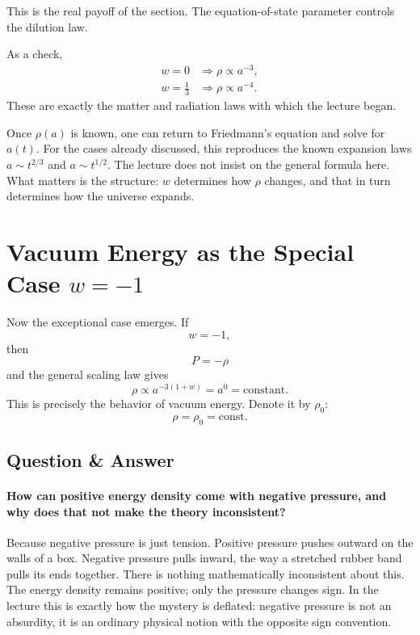 This is the real payoff of the section. The equation-of-state parameter controls the dilution law.

As a check,
\begin{align}
w=0
&\Longrightarrow
\rho \propto a^{-3},
\\
w=\frac{1}{3}
&\Longrightarrow
\rho \propto a^{-4}.
\end{align}
These are exactly the matter and radiation laws with which the lecture began.

Once \(\rho(a)\) is known, one can return to Friedmann's equation and solve for \(a(t)\). For the cases already discussed, this reproduces the known expansion laws \(a\sim t^{2/3}\) and \(a\sim t^{1/2}\). The lecture does not insist on the general formula here. What matters is the structure: \(w\) determines how \(\rho\) changes, and that in turn determines how the universe expands.

\section{Vacuum Energy as the Special Case \(w=-1\)}

Now the exceptional case emerges. If
\begin{equation}
w=-1,
\end{equation}
then
\begin{equation}
P=-\rho
\end{equation}
and the general scaling law gives
\begin{equation}
\rho \propto a^{-3(1+w)} = a^0 = \text{constant}.
\end{equation}
This is precisely the behavior of vacuum energy. Denote it by \(\rho_0\):
\begin{equation}
\rho=\rho_0=\text{const}.
\end{equation}

\subsection{Question \& Answer}

\paragraph{How can positive energy density come with negative pressure, and why does that not make the theory inconsistent?}

Because negative pressure is just tension. Positive pressure pushes outward on the walls of a box. Negative pressure pulls inward, the way a stretched rubber band pulls its ends together. There is nothing mathematically inconsistent about this. The energy density remains positive; only the pressure changes sign. In the lecture this is exactly how the mystery is deflated: negative pressure is not an absurdity, it is an ordinary physical notion with the opposite sign convention.

